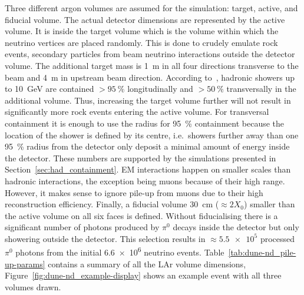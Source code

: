 \documentclass[a4paper]{article}
\begin{document}
Three different argon volumes are assumed for the simulation: target, active, and fiducial volume.
The actual detector dimensions are represented by the active volume.
It is inside the target volume which is the volume within which the neutrino vertices are placed randomly.
This is done to crudely emulate rock events, secondary particles from beam neutrino interactions outside the detector volume.
The additional target mass is \SI{1}{\metre} in all four directions transverse to the beam and \SI{4}{\metre} in upstream beam direction.
According to~\cite{hardon}, hadronic showers up to \SI{10}{\giga\electronvolt} are contained $> \SI{95}{\percent}$ longitudinally and $> \SI{50}{\percent}$ transversally in the additional volume.
Thus, increasing the target volume further will not result in significantly more rock events entering the active volume.
For transversal containment it is enough to use the radius for \SI{95}{\percent} containment because the location of the shower is defined by its centre, i.e.\ showers further away than one \SI{95}{\percent} radius from the detector only deposit a minimal amount of energy inside the detector.
These numbers are supported by the simulations presented in Section~\ref{sec:had_containment}.
EM interactions happen on smaller scales than hadronic interactions, the exception being muons because of their high range.
However, it makes sense to ignore pile-up from muons due to their high reconstruction efficiency.
Finally, a fiducial volume \SI{30}{\centi\metre} ($\approx 2X_0$) smaller than the active volume on all six faces is defined.
Without fiducialising there is a significant number of photons produced by $\pi^0$ decays inside the detector but only showering outside the detector.
This selection results in $\approx \num{5.5e5}$ processed $\pi^0$ photons from the initial \num{6.6e6} neutrino events.
Table~\ref{tab:dune-nd_pile-up-params} contains a summary of all the LAr volume dimensions, Figure~\ref{fig:dune-nd_example-display} shows an example event with all three volumes drawn.
\end{document}
